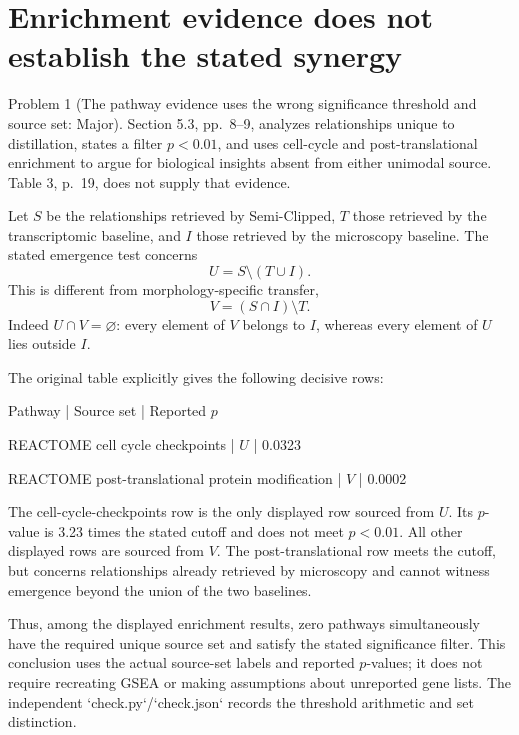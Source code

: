 \documentclass[10pt]{article}
\begin{document}
\section*{Enrichment evidence does not establish the stated synergy}
Problem 1 (The pathway evidence uses the wrong significance threshold and source set: Major).  Section 5.3, pp. 8–9, analyzes relationships unique to distillation, states a filter \(p<0.01\), and uses cell-cycle and post-translational enrichment to argue for biological insights absent from either unimodal source. Table 3, p. 19, does not supply that evidence.\par
Let \(S\) be the relationships retrieved by Semi-Clipped, \(T\) those retrieved by the transcriptomic baseline, and \(I\) those retrieved by the microscopy baseline. The stated emergence test concerns \[U=S\setminus(T\cup I).\] This is different from morphology-specific transfer, \[V=(S\cap I)\setminus T.\] Indeed \(U\cap V=\varnothing\): every element of \(V\) belongs to \(I\), whereas every element of \(U\) lies outside \(I\).\par
The original table explicitly gives the following decisive rows:\par
Pathway | Source set | Reported \(p\)\par
REACTOME cell cycle checkpoints | \(U\) | 0.0323\par
REACTOME post-translational protein modification | \(V\) | 0.0002\par
The cell-cycle-checkpoints row is the only displayed row sourced from \(U\). Its \(p\)-value is 3.23 times the stated cutoff and does not meet \(p<0.01\). All other displayed rows are sourced from \(V\). The post-translational row meets the cutoff, but concerns relationships already retrieved by microscopy and cannot witness emergence beyond the union of the two baselines.\par
Thus, among the displayed enrichment results, zero pathways simultaneously have the required unique source set and satisfy the stated significance filter. This conclusion uses the actual source-set labels and reported \(p\)-values; it does not require recreating GSEA or making assumptions about unreported gene lists. The independent `check.py`/`check.json` records the threshold arithmetic and set distinction.\par
\end{document}
